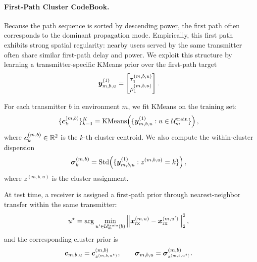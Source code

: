 \paragraph{First-Path Cluster CodeBook.}
Because the path sequence is sorted by descending power, the first path often corresponds to the dominant propagation mode. Empirically, this first path exhibits strong spatial regularity: nearby users served by the same transmitter often share similar first-path delay and power. We exploit this structure by learning a transmitter-specific KMeans prior over the first-path target
\begin{equation}
\boldsymbol{y}^{(1)}_{m,b,u}
=
\begin{bmatrix}
\tau_1^{(m,b,u)}\\
\rho_1^{(m,b,u)}
\end{bmatrix}.
\label{eq:first_path_target}
\end{equation}

For each transmitter $b$ in environment $m$, we fit KMeans on the training set:
\begin{equation}
\{\boldsymbol{c}^{(m,b)}_k\}_{k=1}^{K}
=
\mathrm{KMeans}\!\left(
\{\boldsymbol{y}^{(1)}_{m,b,u}:u\in\mathcal{U}^{\mathrm{train}}_m\}
\right),
\label{eq:kmeans_centers}
\end{equation}
where $\boldsymbol{c}^{(m,b)}_k\in\mathbb{R}^2$ is the $k$-th cluster centroid. We also compute the within-cluster dispersion
\begin{equation}
\boldsymbol{\sigma}^{(m,b)}_k
=
\mathrm{Std}\!\left(
\{\boldsymbol{y}^{(1)}_{m,b,u}: z^{(m,b,u)}=k\}
\right),
\label{eq:kmeans_std}
\end{equation}
where $z^{(m,b,u)}$ is the cluster assignment.

At test time, a receiver is assigned a first-path prior through nearest-neighbor transfer within the same transmitter:
\begin{equation}
u^\star
=
\arg\min_{u' \in \mathcal{U}^{\mathrm{train}}_m(b)}
\left\|
\boldsymbol{x}^{(m,u)}_{\mathrm{rx}}
-
\boldsymbol{x}^{(m,u')}_{\mathrm{rx}}
\right\|_2^2,
\label{eq:nn_assignment}
\end{equation}
and the corresponding cluster prior is
\begin{equation}
\boldsymbol{c}_{m,b,u}=\boldsymbol{c}^{(m,b)}_{z^{(m,b,u^\star)}},
\qquad
\boldsymbol{\sigma}_{m,b,u}=\boldsymbol{\sigma}^{(m,b)}_{z^{(m,b,u^\star)}}.
\label{eq:assigned_cluster_prior}
\end{equation}

